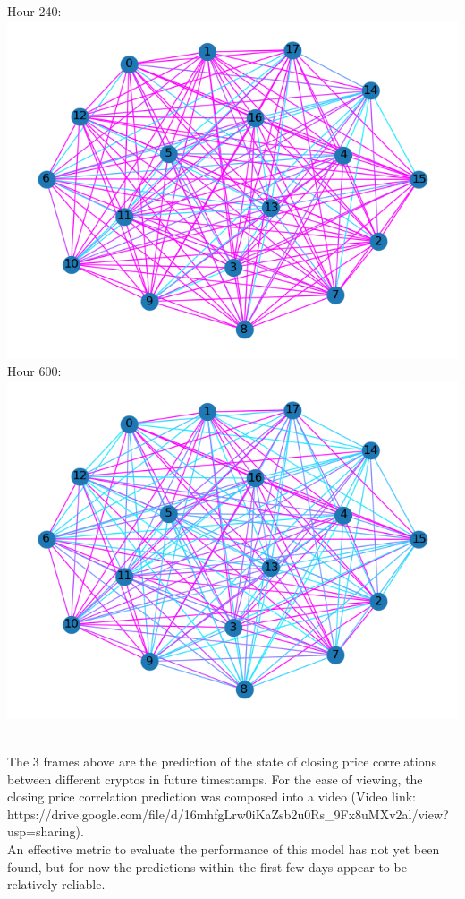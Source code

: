 \documentclass[11pt]{article}
\begin{document}
\begin{minipage}{0.3\textwidth}
Hour 240:\\
\includegraphics[scale=0.35]{../cor_images/p_860.png}\\
Hour 600:\\
\includegraphics[scale=0.35]{../cor_images/p_950.png}
\end{minipage}\\[2mm]
The 3 frames above are the prediction of the state of closing price correlations between different cryptos in future timestamps. For the ease of viewing, the closing price correlation prediction was composed into a video (Video link: https://drive.google.com/file/d/16mhfgLrw0iKaZsb2u0Rs\_9Fx8uMXv2al/view?usp=sharing).\\[2mm]
An effective metric to evaluate the performance of this model has not yet been found, but for now the predictions within the first few days appear to be relatively reliable.
\end{document}
